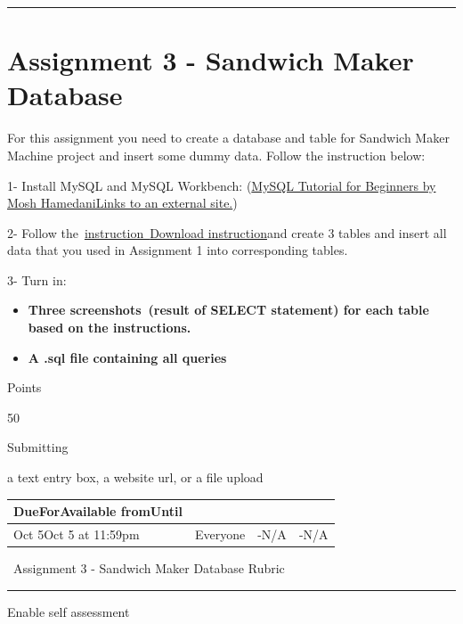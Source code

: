 \documentclass[
]{article}
\providecommand{\tightlist}{%
  \setlength{\itemsep}{0pt}\setlength{\parskip}{0pt}}
\begin{document}
\begin{center}\rule{0.5\linewidth}{0.5pt}\end{center}

\section{Assignment 3 - Sandwich Maker
Database}\label{assignment-3---sandwich-maker-database}

For this assignment you need to create a database and table for Sandwich
Maker Machine project and insert some dummy data. Follow the instruction
below:

1- Install MySQL and MySQL Workbench:
(\href{https://www.youtube.com/watch?v=7S_tz1z_5bA}{MySQL Tutorial for
Beginners by Mosh HamedaniLinks to an external site.})

2- Follow
the~\href{https://instructure.charlotte.edu/courses/264138/files/33808460?wrap=1}{instruction~}\href{https://instructure.charlotte.edu/courses/264138/files/33808460/download?download_frd=1}{Download
instruction}and create 3 tables and insert all data that you used in
Assignment 1 into corresponding tables.

3- Turn in:

\begin{itemize}
\tightlist
\item
  \textbf{Three screenshots~(result of SELECT statement) for each table
  based on the instructions.}
\item
  \textbf{A .sql file containing all queries}
\end{itemize}

Points

50

Submitting

a text entry box, a website url, or a file upload

\begin{longtable}[]{@{}llll@{}}
\toprule\noalign{}
DueForAvailable fromUntil & & & \\
\midrule\noalign{}
\endhead
\bottomrule\noalign{}
\endlastfoot
Oct 5Oct 5 at 11:59pm & Everyone & -N/A & -N/A \\
\end{longtable}

~Assignment 3 - Sandwich Maker Database Rubric

\begin{center}\rule{0.5\linewidth}{0.5pt}\end{center}

Enable self assessment
\end{document}
